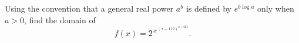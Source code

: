 Using the convention that a general real power $a^b$ is defined by $e^{b\log a}$ only when $a>0$, find the domain of
\[f(x)=2^{\,x^{\,(x+112)^{x+223}}}.\]
